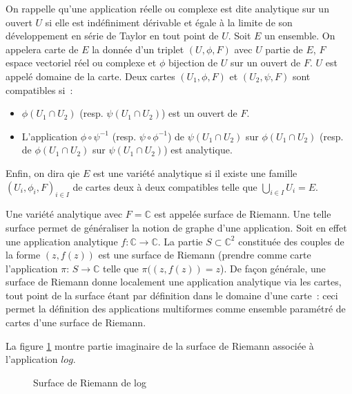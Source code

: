 On rappelle qu'une application réelle ou complexe est dite analytique
sur un ouvert $U$ si elle est indéfiniment dérivable et égale à la
limite de son développement en série de Taylor en tout point de $U$. 
Soit $E$ un ensemble. On appelera carte de $E$ la donnée d'un triplet
$(U, \phi, F)$ avec $U$ partie de $E$, $F$ espace vectoriel réel ou
complexe et $\phi$ bijection de $U$ sur un ouvert de $F$. $U$ est
appelé domaine de la carte. Deux cartes $(U_1, \phi, F)$ et $(U_2,
\psi, F)$ sont compatibles si~:
\begin{itemize}
\item $\phi(U_1 \cap U_2)$ (resp. $\psi(U_1 \cap U_2)$) est un ouvert
de $F$.
\item L'application $\phi \circ \psi^{-1}$ (resp. $\psi \circ
\phi^{-1}$) de $\psi(U_1 \cap U_2)$ sur $\phi(U_1 \cap U_2)$ (resp. de
$\phi(U_1 \cap U_2)$ sur $\psi(U_1 \cap U_2)$) est analytique.
\end{itemize}
Enfin, on dira qie $E$ est une variété analytique si il existe une
famille $(U_i, \phi_i, F)_{i \in I}$ de  cartes deux à deux compatibles telle
que $\bigcup_{i \in I} U_i = E$.

Une variété analytique avec $F = \mathbb{C}$ est appelée surface de
Riemann. Une telle surface permet de généraliser la notion de graphe
d'une application. Soit en effet une application analytique $f :
\mathbb{C} \to \mathbb{C}$. La partie  $S \subset \mathbb{C}^2$ constituée des
couples de la forme $(z, f(z))$ est une surface de Riemann (prendre
comme carte l'application $\pi : \, S \to \mathbb{C}$ telle que
$\pi((z, f(z)) = z$). De façon générale, une surface de Riemann donne
localement une application analytique via les cartes, tout point de la
surface étant par définition dans le domaine d'une carte~: ceci permet
la définition des applications multiformes comme ensemble paramétré de
cartes d'une surface de Riemann. 

La figure \ref{Fi:fig4} montre partie imaginaire de  la surface de
Riemann associée à l'application $log$.
\begin{figure}[h]
\caption{Surface de Riemann de log}\label{Fi:fig4}
\end{figure}
